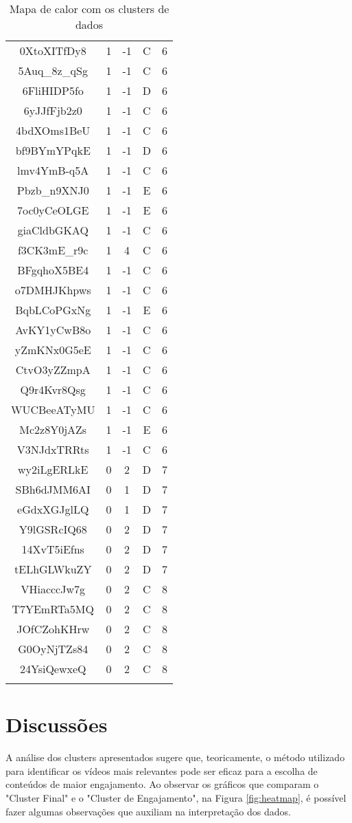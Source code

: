 \documentclass[manuscript,screen,review]{acmart}
\begin{document}
\begin{longtable}{|c|c|c|c|c|}
0XtoXITfDy8 & 1 & -1 & C & 6 \\
5Auq\_8z\_qSg & 1 & -1 & C & 6 \\
6FliHIDP5fo & 1 & -1 & D & 6 \\
6yJJfFjb2z0 & 1 & -1 & C & 6 \\
4bdXOms1BeU & 1 & -1 & C & 6 \\
bf9BYmYPqkE & 1 & -1 & D & 6 \\
lmv4YmB-q5A & 1 & -1 & C & 6 \\
Pbzb\_n9XNJ0 & 1 & -1 & E & 6 \\
7oc0yCeOLGE & 1 & -1 & E & 6 \\
giaCldbGKAQ & 1 & -1 & C & 6 \\
f3CK3mE\_r9c & 1 & 4 & C & 6 \\
BFgqhoX5BE4 & 1 & -1 & C & 6 \\
o7DMHJKhpws & 1 & -1 & C & 6 \\
BqbLCoPGxNg & 1 & -1 & E & 6 \\
AvKY1yCwB8o & 1 & -1 & C & 6 \\
yZmKNx0G5eE & 1 & -1 & C & 6 \\
CtvO3yZZmpA & 1 & -1 & C & 6 \\
Q9r4Kvr8Qsg & 1 & -1 & C & 6 \\
WUCBeeATyMU & 1 & -1 & C & 6 \\
Mc2z8Y0jAZs & 1 & -1 & E & 6 \\
V3NJdxTRRts & 1 & -1 & C & 6 \\
wy2iLgERLkE & 0 & 2 & D & 7 \\
SBh6dJMM6AI & 0 & 1 & D & 7 \\
eGdxXGJglLQ & 0 & 1 & D & 7 \\
Y9lGSRcIQ68 & 0 & 2 & D & 7 \\
14XvT5iEfns & 0 & 2 & D & 7 \\
tELhGLWkuZY & 0 & 2 & D & 7 \\
VHiacccJw7g & 0 & 2 & C & 8 \\
T7YEmRTa5MQ & 0 & 2 & C & 8 \\
JOfCZohKHrw & 0 & 2 & C & 8 \\
G0OyNjTZs84 & 0 & 2 & C & 8 \\
24YsiQewxeQ & 0 & 2 & C & 8 \\
\hline
\caption{Mapa de calor com os clusters de dados}
\end{longtable}

\newpage
\section{Discussões}
A análise dos clusters apresentados sugere que, teoricamente, o método utilizado para identificar os vídeos mais relevantes pode ser eficaz para a escolha de conteúdos de maior engajamento. Ao observar os gráficos que comparam o "Cluster Final" e o "Cluster de Engajamento", na Figura \ref{fig:heatmap}, é possível fazer algumas observações que auxiliam na interpretação dos dados.
\end{document}
